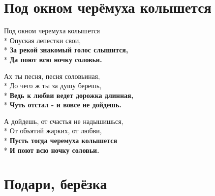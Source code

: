 \vspace{\fill}\newpage

\section{Под окном черёмуха колышется}
\label{song:Под_окном_черёмуха_колышется}

\medskip

\begin{minipage}{\linewidth}
Под окном черемуха колышется\\*
Опуская лепестки свои,\\*
\textbf{За рекой знакомый голос слышится,}\\*
\textbf{Да поют всю ночку соловьи.}\\
\end{minipage}\par\medskip\nobreak

\medskip

\begin{minipage}{\linewidth}
Ах ты песня, песня соловьиная,\\*
До чего ж ты за душу берешь,\\*
\textbf{Ведь к любви ведет дорожка длинная,}\\*
\textbf{Чуть отстал - и вовсе не дойдешь.}\\
\end{minipage}\par\medskip\nobreak

\medskip

\begin{minipage}{\linewidth}
А дойдешь, от счастья не надышишься,\\*
От объятий жарких, от любви,\\*
\textbf{Пусть тогда черемуха колышется}\\*
\textbf{И поют всю ночку соловьи.}\\
\end{minipage}

\vspace{\fill}\newpage

\section{Подари, берёзка}
\label{song:Подари,_берёзка}


